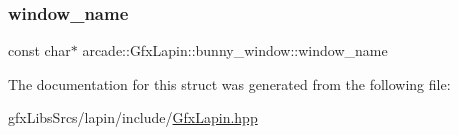 \subsubsection{\texorpdfstring{window\+\_\+name}{window\_name}}
{\footnotesize\ttfamily const char$\ast$ arcade\+::\+Gfx\+Lapin\+::bunny\+\_\+window\+::window\+\_\+name}



The documentation for this struct was generated from the following file\+:\begin{DoxyCompactItemize}
\item 
gfx\+Libs\+Srcs/lapin/include/\hyperlink{_gfx_lapin_8hpp}{Gfx\+Lapin.\+hpp}\end{DoxyCompactItemize}
